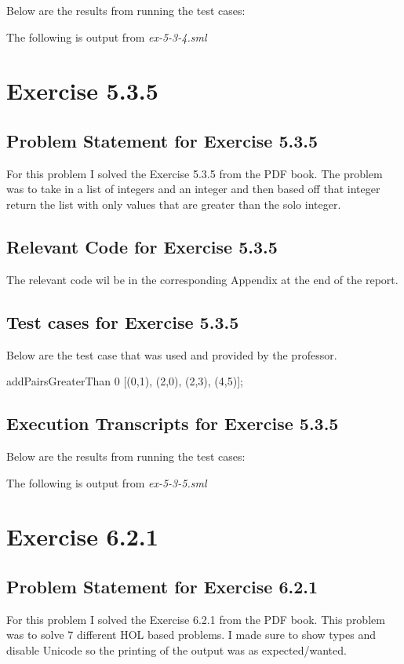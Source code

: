 \documentclass{report}
\begin{document}
Below are the results from running the test cases:

The following is output from \emph{ex-5-3-4.sml}


\chapter{Exercise 5.3.5}
\label{cha:exercise-5-3-5}

\section{Problem Statement for Exercise 5.3.5}
\label{sec:problem-statement-ex-5-3-5}
For this problem I solved the Exercise 5.3.5 from the PDF book. The
problem was to take in a list of integers and an integer and then
based off that integer return the list with only values that are
greater than the solo integer.

\section{Relevant Code for Exercise 5.3.5}
\label{sec:relevant-code-ex-5-3-5}
  The relevant code wil be in the corresponding Appendix at the
  end of the report.

\section{Test cases for Exercise 5.3.5}
\label{sec:tests-ex-5-3-5}
Below are the test case that was used and provided by the professor.

addPairsGreaterThan 0 [(0,1), (2,0), (2,3), (4,5)];

\section{Execution Transcripts for Exercise 5.3.5}
\label{sec:exe-ex-5-3-5}
Below are the results from running the test cases:

The following is output from \emph{ex-5-3-5.sml}


\chapter{Exercise 6.2.1}
\label{cha:exercise-6-2-1}

\section{Problem Statement for Exercise 6.2.1}
\label{sec:problem-statement-ex-6-2-1}
For this problem I solved the Exercise 6.2.1 from the PDF book. This
problem was to solve 7 different HOL based problems. I made sure to
show types and disable Unicode so the printing of the output was as
expected/wanted.
\end{document}
